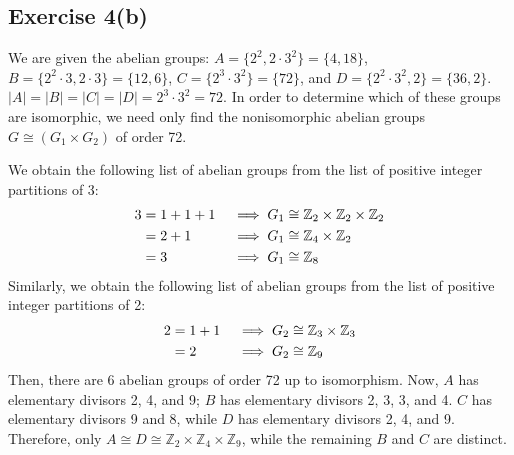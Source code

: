 \subsection*{Exercise 4(b)}
We are given the abelian groups:
$A = \{2^2, 2 \cdot 3^2\} = \{4,18\}$, $B = \{2^2 \cdot 3, 2 \cdot 3\} = \{12,6\}$, $C = \{2^3 \cdot 3^2\} = \{72\}$, and $D = \{2^2 \cdot 3^2, 2\} = \{36,2\}$. $|A| = |B| = |C| = |D| = 2^3\cdot3^2 = 72$. In order to determine which of these groups are isomorphic, we need only find the nonisomorphic abelian groups $G \cong (G_1 \times G_2)$ of order 72.

We obtain the following list of abelian groups from the list of positive integer partitions of 3:
\begin{align}
    \setcounter{equation}{0}
    3 &= 1+1+1 &&\implies G_1 \cong \mathbb{Z}_2 \times \mathbb{Z}_2 \times \mathbb{Z}_2 \\
    &= 2+1 &&\implies G_1 \cong \mathbb{Z}_4 \times\mathbb{Z}_2 \\
    &= 3 &&\implies G_1 \cong \mathbb{Z}_{8}
\end{align}
Similarly, we obtain the following list of abelian groups from the list of positive integer partitions of 2:
\begin{align}
    \setcounter{equation}{0}
    2 &= 1+1 &&\implies G_2 \cong \mathbb{Z}_3 \times \mathbb{Z}_3 \\
    &= 2 &&\implies G_2 \cong \mathbb{Z}_9
\end{align}
Then, there are 6 abelian groups of order 72 up to isomorphism. Now, $A$ has elementary divisors 2, 4, and 9; $B$ has elementary divisors 2, 3, 3, and 4. $C$ has elementary divisors 9 and 8, while $D$ has elementary divisors 2, 4, and 9. Therefore, only $A \cong D \cong \mathbb{Z}_2 \times \mathbb{Z}_4 \times \mathbb{Z}_9$, while the remaining $B$ and $C$ are distinct.